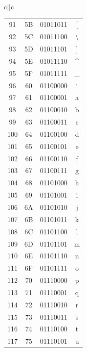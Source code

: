 \begin{table}[H]
{\begin{tabular}{c||c}
\begin{tabular}{cccc}
				91      & 5B          & 01011011 & [               \\
				92      & 5C          & 01011100 & \textbackslash  \\
				93      & 5D          & 01011101 & ]               \\
				94      & 5E          & 01011110 & \^{}            \\
				95      & 5F          & 01011111 & \_              \\
				96      & 60          & 01100000 & `               \\
				97      & 61          & 01100001 & a               \\
				98      & 62          & 01100010 & b               \\
				99      & 63          & 01100011 & c               \\
				100     & 64          & 01100100 & d               \\
				101     & 65          & 01100101 & e               \\
				102     & 66          & 01100110 & f               \\
				103     & 67          & 01100111 & g               \\
				104     & 68          & 01101000 & h               \\
				105     & 69          & 01101001 & i               \\
				106     & 6A          & 01101010 & j               \\
				107     & 6B          & 01101011 & k               \\
				108     & 6C          & 01101100 & l               \\
				109     & 6D          & 01101101 & m               \\
				110     & 6E          & 01101110 & n               \\
				111     & 6F          & 01101111 & o               \\
				112     & 70          & 01110000 & p               \\
				113     & 71          & 01110001 & q               \\
				114     & 72          & 01110010 & r               \\
				115     & 73          & 01110011 & s               \\
				116     & 74          & 01110100 & t               \\
				117     & 75          & 01110101 & u               \\

\end{tabular}
\end{tabular}}
\end{table}
